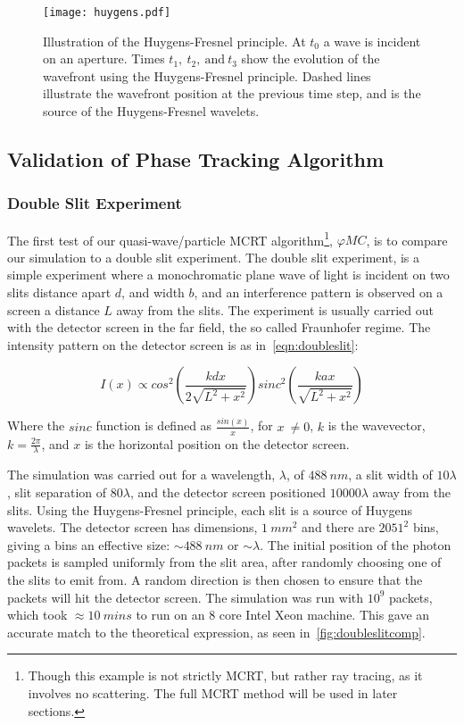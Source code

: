 \begin{figure}[!ht]
    \centering
    \texttt{[image: huygens.pdf]}
    \caption{Illustration of the Huygens-Fresnel principle. At $t_0$ a wave is incident on an aperture. Times $t_1,\ t_2,\ \text{and}\ t_3$ show the evolution of the wavefront using the Huygens-Fresnel principle. Dashed lines illustrate the wavefront position at the previous time step, and is the source of the Huygens-Fresnel wavelets.}
    \label{fig:huygensillis}
\end{figure}

\subsection{Validation of Phase Tracking Algorithm}

\subsubsection*{Double Slit Experiment}

The first test of our quasi-wave/particle MCRT algorithm\footnote{Though this example is not strictly MCRT, but rather ray tracing, as it involves no scattering. The full MCRT method will be used in later sections.}, $\varphi MC$, is to compare our simulation to a double slit experiment.
The double slit experiment, is a simple experiment where a monochromatic plane wave of light is incident on two slits distance apart $d$, and width $b$, and an interference pattern is observed on a screen a distance $L$ away from the slits. The experiment is usually carried out with the detector screen in the far field, the so called Fraunhofer regime.
The intensity pattern on the detector screen is as in~\cref{eqn:doubleslit}:

\begin{equation}
    I(x) \propto cos^2\left(\frac{kdx}{2\sqrt{L^2+x^2}}\right)sinc^2\left(\frac{kax}{\sqrt{L^2+x^2}}\right)
    \label{eqn:doubleslit}
\end{equation}

Where the $sinc$ function is defined as $\tfrac{sin(x)}{x}$, for $x\ \neq 0$, $k$ is the wavevector, $k=\tfrac{2\pi}{\lambda}$, and $x$ is the horizontal position on the detector screen.

The simulation was carried out for a wavelength, $\lambda$,  of $488~nm$, a slit width of $10\lambda$, slit separation of $80\lambda$, and the detector screen positioned $10000\lambda$ away from the slits.
Using the Huygens-Fresnel principle, each slit is a source of Huygens wavelets.
The detector screen has dimensions, $1~mm^2$ and there are $2051^2$ bins, giving a bins an effective size: $\sim 488~nm$ or $\sim \lambda$.
The initial position of the photon packets is sampled uniformly from the slit area, after randomly choosing one of the slits to emit from.
A random direction is then chosen to ensure that the packets will hit the detector screen.
The simulation was run with $10^9$ packets, which took $\approx10~mins$ to run on an 8 core Intel Xeon machine.
This gave an accurate match to the theoretical expression, as seen in~\cref{fig:doubleslitcomp}.

